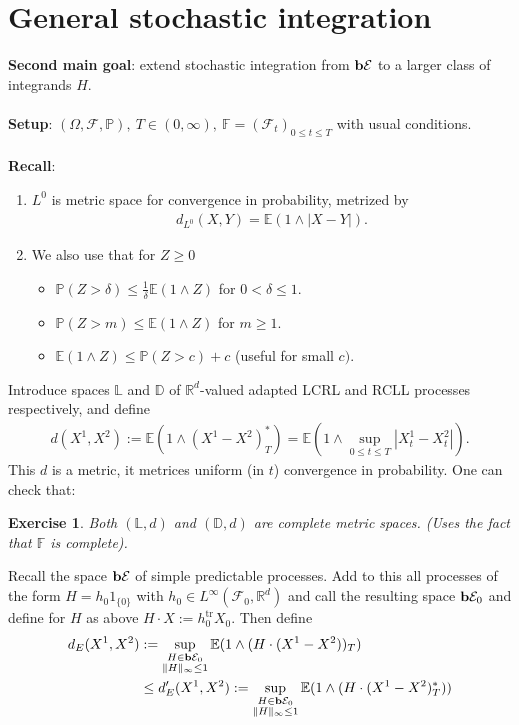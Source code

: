 \documentclass[12pt,a4paper, twoside]{article}
\newtheorem{exe}{Exercise}[section]
\theoremstyle{definition}
\newcommand{\EE}{\mathbb{E}} %
\newcommand{\PP}{\mathbb{P}} %
\newcommand{\simple}{\textbf{\text{b}}\mathcal{E}}
\begin{document}
\section{General stochastic integration}
\textbf{Second main goal}: extend stochastic integration from $\simple$ to a larger class of integrands $H$. 
\\\\
\textbf{Setup}: $( \Omega, \mathcal{F}, \PP), \ T \in (0, \infty), \ \mathbb{F}= ( \mathcal{F}_t)_{0 \leq t \leq T}$ with usual conditions. 
\\
\\
\textbf{Recall}: \
 \begin{enumerate}
\item $L^0$ is metric space for convergence in probability, metrized by 
\begin{align*}
d_{L^0} (X,Y) = \EE(1 \wedge |X-Y|).
\end{align*}
\item We also use that for $Z \geq 0 $ 
\begin{itemize}
\item $\PP(Z > \delta) \leq \frac{1}{\delta} \EE(1 \wedge Z)$ for $0 < \delta \leq 1$.
\item $\PP(Z > m ) \leq \EE(1 \wedge Z)$ for $m \geq 1$. 
\item $\EE(1 \wedge Z) \leq \PP(Z>c) + c$ (useful for small $c)$. 
\end{itemize}
\end{enumerate}
Introduce spaces $\mathbb{L}$ and $\mathbb{D}$ of $\mathbb{R}^d$-valued adapted LCRL and RCLL processes respectively, and define
\begin{align*}
d(X^1, X^2):= \EE( 1 \wedge (X^1-X^2)_T^*) = \EE(1 \wedge \sup_{0 \leq t \leq T} |X_t^1-X_t^2|).
\end{align*}
This $d$ is a metric, it metrices uniform (in $t$) convergence in probability. One can check that:
\begin{exe} Both $(\mathbb{L},d)$ and $( \mathbb{D},d)$ are complete metric spaces. (Uses the fact that $\mathbb{F}$ is complete). 
\end{exe}
Recall the space $\simple$ of simple predictable processes. Add to this all processes of the form $H=h_0 1_{\{0\}}$ with $h_0 \in L^\infty  ( \mathcal{F}_0, \mathbb{R}^d)$ and call the resulting space $\simple_0$ and define for $H$ as above $H \cdot X := h_0^\text{tr}X_0.$ Then define 
\begin{align*}
d_E(X^1,X^2)&:= \sup_{\substack{ H \in \simple_0 \\ \|H\|_\infty \leq 1}} \EE(1 \wedge ( H \cdot (X^1-X^2))_T) \\
&\leq d_E' (X^1,X^2):= \sup_{\substack{ H \in \simple_0  \\ \|H\|_\infty \leq 1}} \EE(1 \wedge (H \cdot (X^1-X^2)_T^*))
\end{align*}
\end{document}
